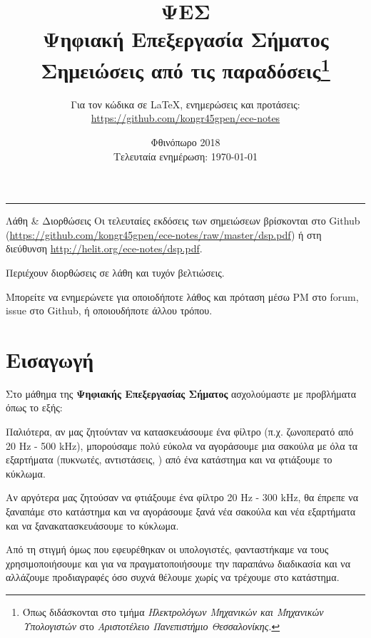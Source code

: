 \documentclass[11pt,a4paper,notitlepage,fleqn]{article}
\title{ΨΕΣ
	\\
	{ 
		\normalsize Ψηφιακή Επεξεργασία Σήματος
		\\
		\normalsize Σημειώσεις από τις παραδόσεις\footnote{Όπως διδάσκονται στο τμήμα \textit{Ηλεκτρολόγων Μηχανικών και Μηχανικών Υπολογιστών} στο \textit{Αριστοτέλειο Πανεπιστήμιο Θεσσαλονίκης}.}
	}}
\date{Φθινόπωρο 2018
	\\
	{ 
		\small Τελευταία ενημέρωση: \today
	}
}
\author{
	Για τον κώδικα σε \LaTeX, ενημερώσεις και προτάσεις:
	\\
	\url{https://github.com/kongr45gpen/ece-notes}}
\begin{document}
\maketitle

\hrule
\vspace{50pt}

\begin{infobox}{Λάθη \& Διορθώσεις}
	Οι τελευταίες εκδόσεις των σημειώσεων βρίσκονται στο Github
	(\url{https://github.com/kongr45gpen/ece-notes/raw/master/dsp.pdf}) ή
	στη διεύθυνση \url{http://helit.org/ece-notes/dsp.pdf}.
	
	Περιέχουν διορθώσεις σε λάθη και τυχόν βελτιώσεις.
	
	\tcblower
	
	Μπορείτε να ενημερώνετε για οποιοδήποτε λάθος και πρόταση
	μέσω PM στο forum, issue στο Github, ή οποιουδήποτε άλλου τρόπου.
\end{infobox}

{
	\hypersetup{linkcolor=black}
	\listoflecture
	\tableofcontents
}

\newpage

\section{Εισαγωγή}

	
Στο μάθημα της \textbf{Ψηφιακής Επεξεργασίας Σήματος} ασχολούμαστε
με προβλήματα όπως το εξής:

Παλιότερα, αν μας ζητούνταν να κατασκευάσουμε ένα φίλτρο (π.χ.
ζωνοπερατό από 20 Hz - 500 kHz), μπορούσαμε πολύ εύκολα να αγοράσουμε μια σακούλα με
όλα τα εξαρτήματα (πυκνωτές, αντιστάσεις, \textellipsis) από ένα
κατάστημα και να φτιάξουμε το κύκλωμα.

Αν αργότερα μας ζητούσαν να φτιάξουμε ένα φίλτρο 20 Hz - 300 kHz, θα
έπρεπε να ξαναπάμε στο κατάστημα και να αγοράσουμε ξανά νέα σακούλα και νέα εξαρτήματα
και να ξανακατασκευάσουμε το κύκλωμα.

Από τη στιγμή όμως που εφευρέθηκαν οι υπολογιστές, φανταστήκαμε να τους
χρησιμοποιήσουμε και για να πραγματοποιήσουμε την παραπάνω διαδικασία και
να αλλάζουμε προδιαγραφές όσο συχνά θέλουμε χωρίς να τρέχουμε στο κατάστημα.
\end{document}
